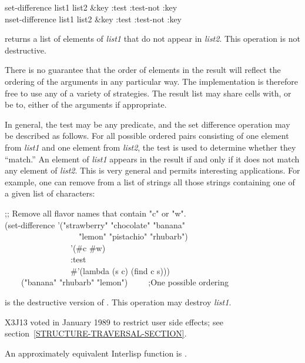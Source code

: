 \begin{defun}[Function]
set-difference list1 list2 &key :test :test-not :key \\
nset-difference list1 list2 &key :test :test-not :key

 returns a list of elements of {\it list1}
that do not appear in {\it list2}.  This operation is
not destructive.

There is no guarantee that the order of elements in the result will
reflect the ordering of the arguments in any particular way.
The implementation is therefore free to use any of a variety of strategies.
The result list may share cells with, or be  to, either of the arguments
if appropriate.

In general, the test may be any predicate, and the set difference operation
may be described as follows.  For all possible ordered pairs consisting of
one element from {\it list1} and one element from {\it list2}, the test is
used to determine whether they ``match.''  An element of {\it list1}
appears in the result if and only if it does not match any element
of {\it list2}.  This is very general and permits interesting applications.
For example, one can remove from a list of strings all those strings
containing one of a given list of characters:
\begin{lisp}
;; Remove all flavor names that contain "c" or "w". \\
(set-difference '("strawberry" "chocolate" "banana" \\
~~~~~~~~~~~~~~~~~~"lemon" "pistachio" "rhubarb") \\
~~~~~~~~~~~~~~~~'(\#{\Xbackslash}c \#{\Xbackslash}w) \\
~~~~~~~~~~~~~~~~:test \\
~~~~~~~~~~~~~~~~\#'(lambda (s c) (find c s))) \\
~~~\EV\ ("banana" "rhubarb" "lemon")~~~~~;{\rm One possible ordering}
\end{lisp}

 is the destructive version of .
This operation may destroy {\it list1}.

\begin{new}
X3J13 voted in January 1989
to restrict user side effects; see section~\ref{STRUCTURE-TRAVERSAL-SECTION}.
\end{new}

\beforenoterule
\begin{incompatibility}
An approximately equivalent Interlisp function
is .
\end{incompatibility}
\afternoterule
\end{defun}

